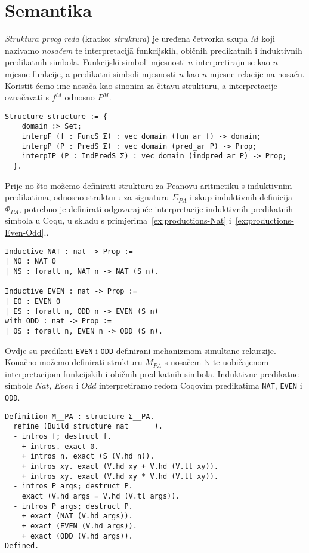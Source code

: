 \section{Semantika}\label{sec:semantika}
\begin{definition}
  \textit{Struktura prvog reda} (kratko: \textit{struktura}) je uređena četvorka skupa \(M\) koji nazivamo \textit{nosačem}
  te interpretacij\=a funkcijskih, običnih predikatnih i induktivnih predikatnih simbola.
  Funkcijski simboli mjesnosti \(n\) interpretiraju se kao \(n\)-mjesne funkcije, a predikatni simboli mjesnosti \(n\) kao \(n\)-mjesne relacije na nosaču.
  Koristit ćemo ime nosača kao sinonim za čitavu strukturu,
  a interpretacije označavati s \(f^{M}\) odnosno \(P^{M}\).
\begin{verbatim}
Structure structure := {
    domain :> Set;
    interpF (f : FuncS Σ) : vec domain (fun_ar f) -> domain;
    interpP (P : PredS Σ) : vec domain (pred_ar P) -> Prop;
    interpIP (P : IndPredS Σ) : vec domain (indpred_ar P) -> Prop;
  }.
\end{verbatim}
\end{definition}

\begin{example}\label{ex:structure}
  Prije no što možemo definirati strukturu za Peanovu aritmetiku s induktivnim predikatima,
  odnosno strukturu za signaturu \(\Sigma_{\mathit{PA}}\) i skup induktivnih definicija \(\Phi_{\mathit{PA}}\),
  potrebno je definirati odgovarajuće interpretacije induktivnih predikatnih simbola u Coqu, u skladu s primjerima~\ref{ex:productions-Nat} i~\ref{ex:productions-Even-Odd}..
\begin{verbatim}
Inductive NAT : nat -> Prop :=
| NO : NAT 0
| NS : forall n, NAT n -> NAT (S n).

Inductive EVEN : nat -> Prop :=
| EO : EVEN 0
| ES : forall n, ODD n -> EVEN (S n)
with ODD : nat -> Prop :=
| OS : forall n, EVEN n -> ODD (S n).
\end{verbatim}
  \noindent Ovdje su predikati \texttt{EVEN} i \texttt{ODD} definirani mehanizmom simultane rekurzije.\\
  \noindent Konačno možemo definirati strukturu \(M_{\mathit{PA}}\) s nosačem \(\mathbb{N}\) te uobičajenom interpretacijom
  funkcijskih i običnih predikatnih simbola. Induktivne predikatne simbole
  \(\mathit{Nat}\), \(\mathit{Even}\) i \(\mathit{Odd}\)
  interpretiramo redom Coqovim predikatima \texttt{NAT}, \texttt{EVEN} i \texttt{ODD}.
\begin{verbatim}
Definition M__PA : structure Σ__PA.
  refine (Build_structure nat _ _ _).
  - intros f; destruct f.
    + intros. exact 0.
    + intros n. exact (S (V.hd n)).
    + intros xy. exact (V.hd xy + V.hd (V.tl xy)).
    + intros xy. exact (V.hd xy * V.hd (V.tl xy)).
  - intros P args; destruct P.
    exact (V.hd args = V.hd (V.tl args)).
  - intros P args; destruct P. 
    + exact (NAT (V.hd args)).
    + exact (EVEN (V.hd args)).
    + exact (ODD (V.hd args)).
Defined.
\end{verbatim}
\end{example}

